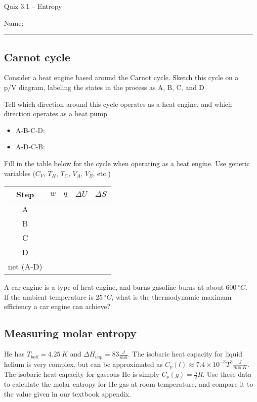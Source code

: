 \documentclass[11pt, letterpaper]{memoir}
\begin{document}
	\begin{center}
		{\large Quiz 3.1 -- Entropy}
	\end{center}
	{\large Name: \rule[-1mm]{4in}{.1pt} 
		
\subsection*{Carnot cycle}
Consider a heat engine based around the Carnot cycle. Sketch this cycle on a p/V diagram, labeling the states in the process as A, B, C, and D

\vspace{6em}\noindent
Tell which direction around this cycle operates as a heat engine, and which direction operates as a heat pump
\begin{itemize}
	\item A-B-C-D:
	\item A-D-C-B: 
\end{itemize}

\noindent
Fill in the table below for the cycle when operating as a heat engine. Use generic variables ($C_V$, $T_H$, $T_C$, $V_A$, $V_B$, etc.)

\noindent
\begin{tabular}{|c|c|c|c|c|}
	\toprule
	Step & $w$ & $q$ & $\Delta U$ & $\Delta S$ \\ \midrule
	A & \hspace{1.25in} & \hspace{1.25in} & \hspace{1.25in} & \hspace{1.25in} \\ \midrule
	B &&&&\\ \midrule
	C &&&&\\ \midrule
	D &&&&\\ \midrule \midrule
	net (A-D) &&&& \\\bottomrule
\end{tabular}

\vspace{1em}
\noindent
A car engine is a type of heat engine, and burns gasoline burns at about $600~^\circ C$. If the ambient temperature is $25~^\circ C$, what is the thermodynamic maximum efficiency a car engine can achieve?

\vspace{6em}
\subsection*{Measuring molar entropy}
He has $T_{boil}=4.25~K$ and $\Delta H_{vap} = 83\frac{J}{mol}$. The isobaric heat capacity for liquid helium is very complex, but can be approximated as $C_p(l)\approx 7.4\times10^{-3}T^3\frac{J}{mol~K}$. The isobaric heat capacity for gaseous He is simply $C_p(g)=\frac{5}{2}R$. Use these data to calculate the molar entropy for He gas at room temperature, and compare it to the value given in our textbook appendix.

}
\end{document}
